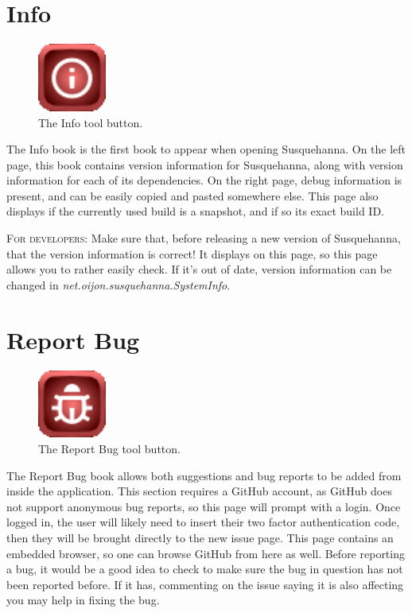 \documentclass{report}
\begin{document}
	\section{Info}\label{sec:info}
	\begin{figure}
		\centering
		\includegraphics[width=0.2\textwidth]{img/info}
		\caption{The Info tool button.}
		\label{fig:info}
	\end{figure}
	The Info book is the first book to appear when opening Susquehanna. On the left page, this book contains version information for Susquehanna, along with version information for each of its dependencies. On the right page, debug information is present, and can be easily copied and pasted somewhere else. This page also displays if the currently used build is a snapshot, and if so its exact build ID.
	\begin{tcolorbox}[width=1\textwidth]
		\textsc{For developers:} Make sure that, before releasing a new version of Susquehanna, that the version information is correct! It displays on this page, so this page allows you to rather easily check. If it's out of date, version information can be changed in \emph{net.oijon.susquehanna.SystemInfo}.
	\end{tcolorbox}
	\section{Report Bug}
	\begin{figure}
		\centering
		\includegraphics[width=0.2\textwidth]{img/report-bug}
		\caption{The Report Bug tool button.}
		\label{fig:report-bug}
	\end{figure}
	The Report Bug book allows both suggestions and bug reports to be added from inside the application. This section requires a GitHub account, as GitHub does not support anonymous bug reports, so this page will prompt with a login. Once logged in, the user will likely need to insert their two factor authentication code, then they will be brought directly to the new issue page. This page contains an embedded browser, so one can browse GitHub from here as well. Before reporting a bug, it would be a good idea to check to make sure the bug in question has not been reported before. If it has, commenting on the issue saying it is also affecting you may help in fixing the bug.
	
\end{document}
